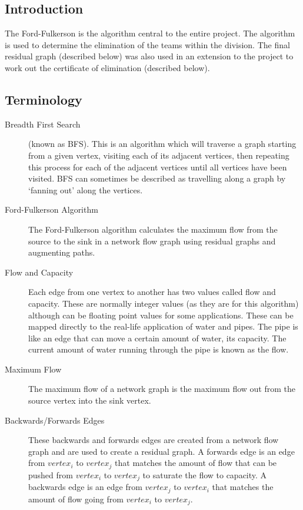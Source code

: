 \subsection{Introduction}

The Ford-Fulkerson is the algorithm central to the entire project. The
algorithm is used to determine the elimination of the teams within the
division. The final residual graph (described below) was also used in an
extension to the project to work out the certificate of elimination
(described below).

\subsection{Terminology}

\begin{description}

\item[Breadth First Search] (known as BFS). This is an algorithm which will
traverse a graph starting from a given vertex, visiting each of its
adjacent vertices, then repeating this process for each of the adjacent
vertices until all vertices have been visited. BFS can sometimes be described
as travelling along a graph by `fanning out' along the vertices.

\item[Ford-Fulkerson Algorithm] The Ford-Fulkerson algorithm calculates the
maximum flow from the source to the sink in a network flow graph using residual 
graphs and augmenting paths.

\item[Flow and Capacity] Each edge from one vertex to another has two values
called flow and capacity. These are normally integer values (as they are for 
this algorithm) although can be floating point values for some applications.
These can be mapped directly to the real-life application of water and pipes.
The pipe is like an edge that can move a certain amount of water, its capacity.
The current amount of water running through the pipe is known as the flow.

\item[Maximum Flow] The maximum flow of a network graph is the maximum flow
out from the source vertex into the sink vertex.

\item[Backwards/Forwards Edges] These backwards and forwards edges are
created from a network flow graph and are used to create a residual graph. A
forwards edge is an edge from $vertex_i$ to $vertex_j$ that matches the
amount of flow that can be pushed from $vertex_i$ to $vertex_j$ to
saturate the flow to capacity. A backwards edge is an edge from $vertex_j$
to $vertex_i$ that matches the amount of flow going from $vertex_i$ to
$vertex_j$.


\end{description}
